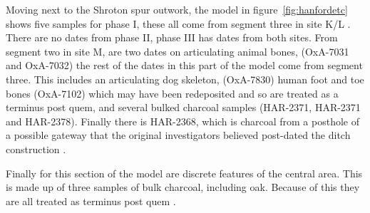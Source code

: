 Moving next to the Shroton spur outwork, the model in figure~\ref{fig:hanfordetc} shows five samples for phase I, these all come from segment three in site K/L \cite[397]{Mercer:2008fk}. There are no dates from phase II, phase III has dates from both sites. From segment two in site M, are two dates on articulating animal bones, (OxA-7031 and OxA-7032) the rest of the dates in this part of the model come from segment three. This includes an articulating dog skeleton, (OxA-7830) human foot and toe bones (OxA-7102) which may have been redeposited \cite[397]{Mercer:2008fk} and so are treated as a terminus post quem, and several bulked charcoal samples (HAR-2371, HAR-2371 and HAR-2378). Finally there is HAR-2368, which is charcoal from a posthole of a possible gateway that the original investigators believed post-dated the ditch construction \cite[398]{Mercer:2008fk}.

Finally for this section of the model are discrete features of the central area. This is made up of three samples of bulk charcoal, including oak. Because of this they are all treated as terminus post quem \cite[402]{Mercer:2008fk}.

